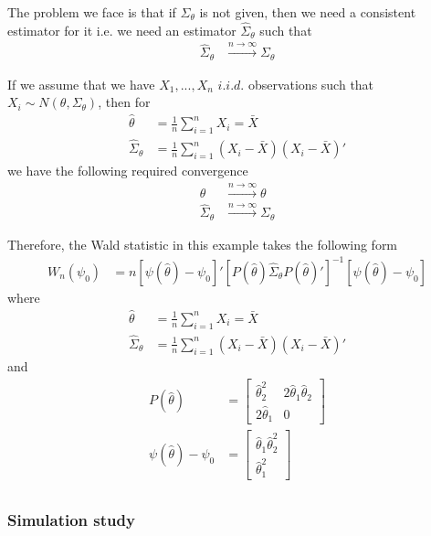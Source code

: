 \documentclass[11pt]{article}\usepackage[]{graphicx}\usepackage[]{color}
\begin{document}
The problem we face is that if $\Sigma_\theta$ is not given, then we need a consistent estimator for it i.e. we need an estimator $\hat{\Sigma}_\theta$ such that
\begin{align}
	\hat{\Sigma}_\theta & \xrightarrow{n \rightarrow \infty} \Sigma_\theta
\end{align}

If we assume that we have $X_1,...,X_n$ $i.i.d.$ observations such that $X_i \sim N(\theta,\Sigma_\theta)$, then for
\begin{align}
	\hat{\theta} &  = \frac{1}{n} \sum_{i=1}^{n} X_i = \bar{X} \\
	\hat{\Sigma}_\theta  & = \frac{1}{n} \sum_{i=1}^{n} (X_i-\bar{X}) (X_i-\bar{X})'
\end{align}
we have the following required convergence
\begin{align}
	\hat{\theta} & \xrightarrow{n \rightarrow \infty} \theta \\
	\hat{\Sigma}_\theta & \xrightarrow{n \rightarrow \infty}  \Sigma_\theta
\end{align}

Therefore, the Wald statistic in this example takes the following form
\begin{align}
	W_n(\psi_0) & = n \left[\psi (\hat{\theta}) - \psi_0\right]' \left[P (\hat{\theta})\hat{\Sigma}_\theta P (\hat{\theta})'\right]^{-1} \left[\psi (\hat{\theta}) - \psi_0\right]
\end{align}
where
\begin{align}
	\hat{\theta} &  = \frac{1}{n} \sum_{i=1}^{n} X_i = \bar{X} \\
	\hat{\Sigma}_\theta  & = \frac{1}{n} \sum_{i=1}^{n} (X_i-\bar{X}) (X_i-\bar{X})'
\end{align}
and
\begin{align}
	P(\hat{\theta}) & = \left[ \begin{array}{cc}
		\hat{\theta}_2^2 & 2\hat{\theta}_1 \hat{\theta}_2 \\
		2\hat{\theta}_1 & 0
	\end{array} \right] \\
	\psi (\hat{\theta}) - \psi_0 & = \left[ \begin{array}{c}
		\hat{\theta}_1 \hat{\theta}_2^2 \\
		\hat{\theta}_1^2
	\end{array} \right] \\
\end{align}

\subsubsection{Simulation study}
\end{document}
